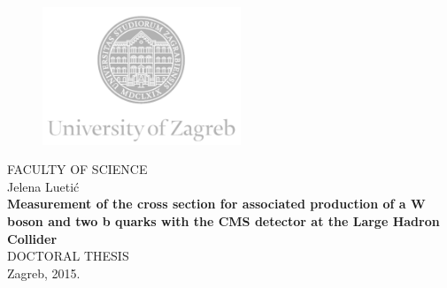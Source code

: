 \documentclass[12pt, oneside]{Thesis}
\begin{document}
\begin{titlepage}
  \fontsize{16pt}{20pt}\selectfont
  \selectfont
  \setlength{\intextsep}{0pt plus 0pt minus 0pt}

  \begin{center}
    \begin{figure}[ht!]
      \begin{center}
        \includegraphics[height=4.1184cm, width=5.94cm]{logo_unizg_eng}
      \end{center}
    \end{figure}
    \vspace{0cm}
    {FACULTY OF SCIENCE} \\
    \vspace{3cm}
    Jelena Luetić \\
    \vspace{2cm}
    {\fontsize{22pt}{22pt}\selectfont\textbf{Measurement of the cross section for associated production of a W boson and two b quarks with the CMS detector at the Large Hadron Collider}} \\
    \vspace{2cm}  
    DOCTORAL THESIS \\    
    \vfill{Zagreb, 2015.}
  \end{center}
\end{titlepage}
\end{document}
